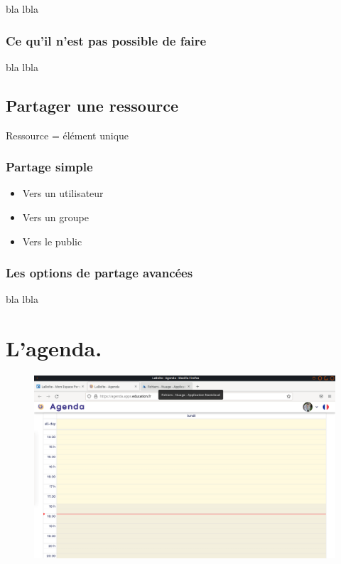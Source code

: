 \documentclass[a4paper, 11pt]{book}
\begin{document}
bla lbla

\subsection*{Ce qu'il n'est pas possible de faire}

bla lbla

\section*{Partager une ressource}

Ressource = élément unique

\subsection*{Partage simple}

\begin{itemize}
    \item Vers un utilisateur
    \item Vers un groupe
    \item Vers le public 
\end{itemize}

\subsection*{Les options de partage avancées}

bla lbla

\chapter*{L'agenda.}

\begin{figure}
    \centering
    \includegraphics{Captures/agenda.jour.png}
\end{figure}
\end{document}
